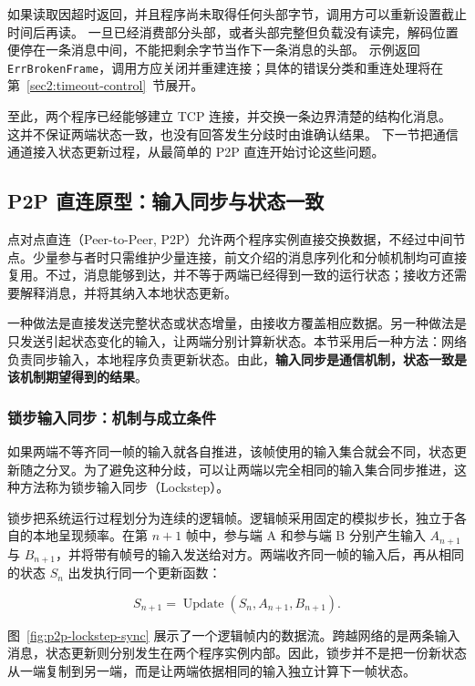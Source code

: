 如果读取因超时返回，并且程序尚未取得任何头部字节，调用方可以重新设置截止时间后再读。
一旦已经消费部分头部，或者头部完整但负载没有读完，解码位置便停在一条消息中间，不能把剩余字节当作下一条消息的头部。
示例返回 \texttt{ErrBrokenFrame}，调用方应关闭并重建连接；具体的错误分类和重连处理将在第~\ref{sec2:timeout-control}~节展开。

至此，两个程序已经能够建立 TCP 连接，并交换一条边界清楚的结构化消息。
这并不保证两端状态一致，也没有回答发生分歧时由谁确认结果。
下一节把通信通道接入状态更新过程，从最简单的 P2P 直连开始讨论这些问题。

\subsection{P2P 直连原型：输入同步与状态一致}\label{sec2:p2p-prototype}

点对点直连（Peer-to-Peer, P2P）允许两个程序实例直接交换数据，不经过中间节点。少量参与者时只需维护少量连接，前文介绍的消息序列化和分帧机制均可直接复用。不过，消息能够到达，并不等于两端已经得到一致的运行状态；接收方还需要解释消息，并将其纳入本地状态更新。

一种做法是直接发送完整状态或状态增量，由接收方覆盖相应数据。另一种做法是只发送引起状态变化的输入，让两端分别计算新状态。本节采用后一种方法：网络负责同步输入，本地程序负责更新状态。由此，\textbf{输入同步是通信机制，状态一致是该机制期望得到的结果}。

\subsubsection{锁步输入同步：机制与成立条件}\label{sec2:lockstep}

如果两端不等齐同一帧的输入就各自推进，该帧使用的输入集合就会不同，状态更新随之分叉。为了避免这种分歧，可以让两端以完全相同的输入集合同步推进，这种方法称为锁步输入同步（Lockstep）。

锁步把系统运行过程划分为连续的逻辑帧。逻辑帧采用固定的模拟步长，独立于各自的本地呈现频率。在第 $n+1$ 帧中，参与端 A 和参与端 B 分别产生输入 $A_{n+1}$ 与 $B_{n+1}$，并将带有帧号的输入发送给对方。两端收齐同一帧的输入后，再从相同的状态 $S_n$ 出发执行同一个更新函数：

\[
S_{n+1}=\operatorname{Update}(S_n,A_{n+1},B_{n+1}).
\]

图~\ref{fig:p2p-lockstep-sync} 展示了一个逻辑帧内的数据流。跨越网络的是两条输入消息，状态更新则分别发生在两个程序实例内部。因此，锁步并不是把一份新状态从一端复制到另一端，而是让两端依据相同的输入独立计算下一帧状态。


